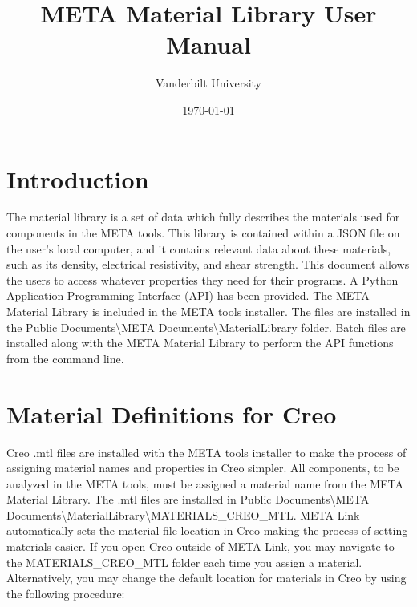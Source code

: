 \documentclass[letter]{article}
\begin{document}
\title{META Material Library User Manual}
\author{Vanderbilt University}
\date{\today}
\maketitle
{}

\section{Introduction}
The material library is a set of data which fully describes the materials used for components in the META tools. This library is contained within a JSON file on the user's local computer, and it contains relevant data about these materials, such as its density, electrical resistivity, and shear strength.  This document allows the users to access whatever properties they need for their programs. A Python Application Programming Interface (API) has been provided. The META Material Library is included in the META tools installer. The files are installed in the Public Documents\textbackslash META Documents\textbackslash MaterialLibrary folder. Batch files are installed along with the META Material Library to perform the API functions from the command line. 

\section{Material Definitions for Creo\textsuperscript{\textregistered}}
Creo\textsuperscript{\textregistered} .mtl files are installed with the META tools installer to make the process of assigning material names and properties in Creo\textsuperscript{\textregistered} simpler. All components, to be analyzed in the META tools, must be assigned a material name from the META Material Library. The .mtl files are installed in Public Documents\textbackslash META Documents\textbackslash MaterialLibrary\textbackslash MATERIALS\_CREO\_MTL. META Link automatically sets the material file location in Creo\textsuperscript{\textregistered} making the process of setting materials easier. If you open Creo\textsuperscript{\textregistered} outside of META Link, you may navigate to the MATERIALS\_CREO\_MTL folder each time you assign a material. Alternatively, you may change the default location for materials in Creo\textsuperscript{\textregistered} by using the following procedure:\\
\end{document}
